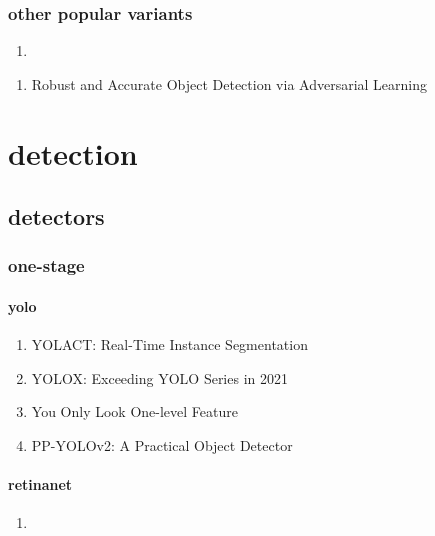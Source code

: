 \documentclass[acmlarge]{acmart}
\begin{document}
		\subsubsection{other popular variants}
		\begin{enumerate}
			\item
		\end{enumerate}
	\begin{enumerate}
	\end{enumerate}
\begin{enumerate}
	\item Robust and Accurate Object Detection via Adversarial Learning \cite{Chen2021RobustAA} 

\end{enumerate}
\section{detection}
	\subsection{detectors}
		\subsubsection{one-stage}
			\paragraph{yolo}
			\begin{enumerate}
				\item YOLACT: Real-Time Instance Segmentation \cite{Bolya2019YOLACTRI} 

				\item YOLOX: Exceeding YOLO Series in 2021 \cite{Ge2021YOLOXEY} 

				\item You Only Look One-level Feature \cite{Chen2021YouOL} 

				\item PP-YOLOv2: A Practical Object Detector \cite{Huang2021PPYOLOv2AP} 

			\end{enumerate}
			\paragraph{retinanet}
			\begin{enumerate}
				\item
			\end{enumerate}
\end{document}
